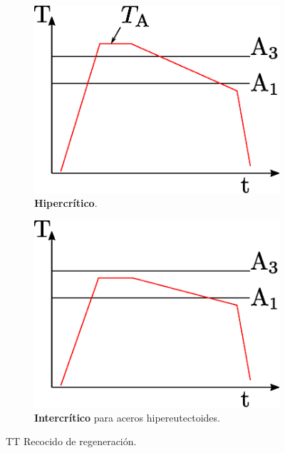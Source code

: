 \documentclass{article}
\begin{document}
\begin{figure}[htb!]
\centering
\begin{subfigure}{0.4\textwidth}
    \includegraphics[width=\linewidth]{fig/TTrecoreg.eps}
    \caption{\textbf{Hipercrítico}.}
    \label{fig:TTrecoreg}
\end{subfigure}
\begin{subfigure}{0.4\textwidth}
    \includegraphics[width=\linewidth]{fig/TTrecoreghiper.eps}
    \caption{\textbf{Intercrítico} para aceros hipereutectoides.}
    \label{fig:TTrecoreghiper}
\end{subfigure}
\caption{TT Recocido de regeneración.}
\end{figure}
\end{document}
